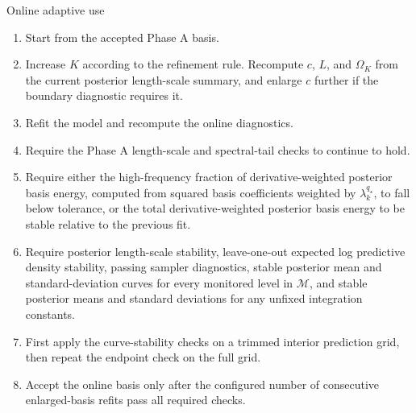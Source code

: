 \documentclass[11pt,a4paper]{article}
\theoremstyle{definition}
\theoremstyle{remark}
\begin{document}
\begin{tartarebox}{Online adaptive use}
\begin{enumerate}[label=\textbf{B\arabic*.},leftmargin=1.8em,itemsep=4pt,topsep=2pt]
\item Start from the accepted Phase A basis.
\item Increase \(K\) according to the refinement rule. Recompute \(c\), \(L\), and \(\Omega_K\) from the current posterior length-scale summary, and enlarge \(c\) further if the boundary diagnostic requires it.
\item Refit the model and recompute the online diagnostics.
\item Require the Phase A length-scale and spectral-tail checks to continue to hold.
\item Require either the high-frequency fraction of derivative-weighted posterior basis energy, computed from squared basis coefficients weighted by \(\lambda_k^{q_\star}\), to fall below tolerance, or the total derivative-weighted posterior basis energy to be stable relative to the previous fit.
\item Require posterior length-scale stability, leave-one-out expected log predictive density stability, passing sampler diagnostics, stable posterior mean and standard-deviation curves for every monitored level in \(\mathcal M\), and stable posterior means and standard deviations for any unfixed integration constants.
\item First apply the curve-stability checks on a trimmed interior prediction grid, then repeat the endpoint check on the full grid.
\item Accept the online basis only after the configured number of consecutive enlarged-basis refits pass all required checks.
\end{enumerate}
\end{tartarebox}
\end{document}

